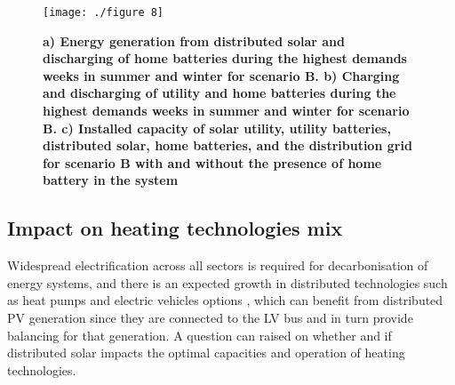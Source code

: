 \documentclass[review]{elsarticle}
\begin{document}
	\begin{figure}
		\texttt{[image: ./figure 8]}
		\caption{\textbf{a) Energy generation from distributed solar and discharging of home batteries during the highest demands weeks in summer and winter for scenario B. b) Charging and discharging of utility and home batteries during the highest demands weeks in summer and winter for scenario B. c) Installed capacity of solar utility, utility batteries, distributed solar, home batteries, and the distribution grid for scenario B with and without the presence of home battery in the system}}
		\label{fig:battery}
	\end{figure}
	
	\subsection{Impact on heating technologies mix}
	
	
	Widespread electrification across all sectors is required for decarbonisation of energy systems, and there is an expected growth in distributed technologies such as heat pumps and electric vehicles options \cite{IEA_globalEV}, which can benefit from distributed PV generation since they are connected to the LV bus and in turn provide balancing for that generation. A question can raised on whether and if distributed solar impacts the optimal capacities and operation of heating technologies. 
	
\end{document}
